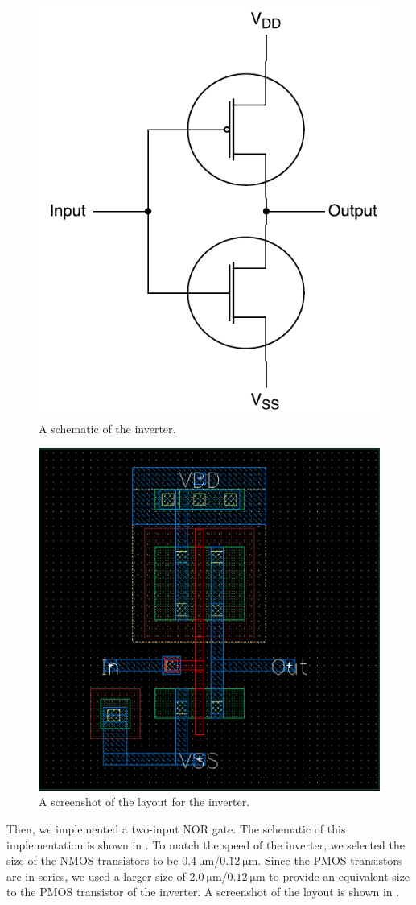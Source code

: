 \documentclass[journal,hidelinks]{IEEEtran}
\begin{document}
\begin{figure}[!htb]
  \centering
  \includegraphics[height=0.5\columnwidth]{diagrams/inverter.pdf}
  \caption{A schematic of the inverter.}
  \label{fig:inverter}
\end{figure}

\begin{figure}[!htb]
  \centering
  \includegraphics[width=0.8\columnwidth]{layout/inverter.png}
  \caption{A screenshot of the layout for the inverter.}
  \label{fig:inverter_layout}
\end{figure}

Then, we implemented a two-input NOR gate. The schematic of this implementation is shown in . To match the speed of the inverter, we selected the size of the NMOS transistors to be $\SI{0.4}{\micro\meter}$/$\SI{0.12}{\micro\meter}$. Since the PMOS transistors are in series, we used a larger size of $\SI{2.0}{\micro\meter}$/$\SI{0.12}{\micro\meter}$ to provide an equivalent size to the PMOS transistor of the inverter. A screenshot of the layout is shown in .
\end{document}
